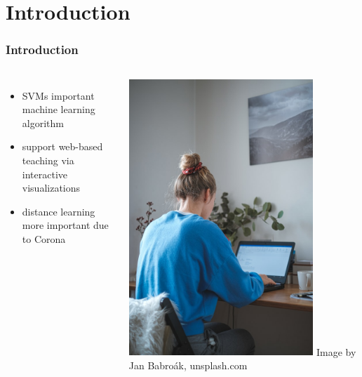\documentclass[english,hangout]{beamer}
\begin{document}
\section{Introduction}
\begin{frame}
	\frametitle{Introduction}

\begin{columns}
	\begin{itemize}
		\item SVMs important machine learning algorithm
		\item support web-based teaching via interactive visualizations
		\item distance learning more important due to Corona
	\end{itemize}
	\includegraphics[width=0.8\textwidth]{images/Beamer/home_office_by_jan-baborak.jpg}
	\tiny{ Image by Jan Babroák, unsplash.com}
\end{columns}

  
  
\end{frame}
\end{document}

